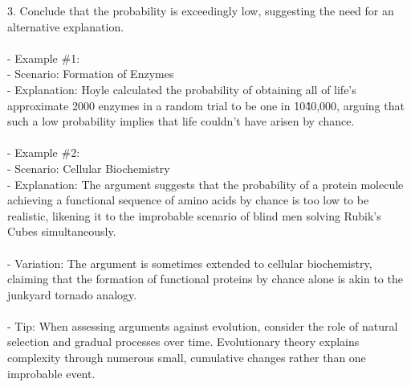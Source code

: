 \documentclass[a4paper,12pt,single,pdftex]{scrartcl}
\begin{document}
    
        3. Conclude that the probability is exceedingly low, suggesting the need for an alternative explanation.
    \\

    
      
    \\

    
      - Example \#1:
    \\

    
        - Scenario: Formation of Enzymes
    \\

    
        - Explanation: Hoyle calculated the probability of obtaining all of life's approximate 2000 enzymes in a random trial to be one in 10\^40,000, arguing that such a low probability implies that life couldn't have arisen by chance.
    \\

    
      
    \\

    
      - Example \#2:
    \\

    
        - Scenario: Cellular Biochemistry
    \\

    
        - Explanation: The argument suggests that the probability of a protein molecule achieving a functional sequence of amino acids by chance is too low to be realistic, likening it to the improbable scenario of blind men solving Rubik's Cubes simultaneously.
    \\

    
      
    \\

    
      - Variation: The argument is sometimes extended to cellular biochemistry, claiming that the formation of functional proteins by chance alone is akin to the junkyard tornado analogy.
    \\

    
      
    \\

    
      - Tip: When assessing arguments against evolution, consider the role of natural selection and gradual processes over time. Evolutionary theory explains complexity through numerous small, cumulative changes rather than one improbable event.
    \\

    
      
\end{document}
